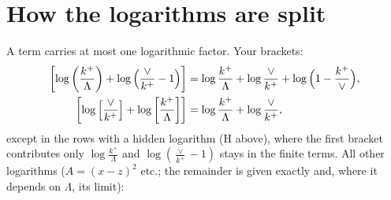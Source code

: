 \documentclass[10pt]{article}
\numberwithin{equation}{section}
\begin{document}
\section{How the logarithms are split}\label{sec:logs}
A term carries at most one logarithmic factor. Your brackets:
\begin{align}
\left[\log{\left(\frac{k^{+}}{\Lambda}\right)}+\log{\left(\frac{\vee}{k^{+}}-1\right)}\right]&=\log\frac{k^+}{\Lambda}+\log\frac{\vee}{k^+}+\log\Big(1-\frac{k^+}{\vee}\Big),\notag\\
\left[\log{\left[\frac{\vee}{k^{+}}\right]}+\log{\left[\frac{k^{+}}{\Lambda}\right]}\right]&=\log\frac{k^+}{\Lambda}+\log\frac{\vee}{k^+},\notag
\end{align}
except in the rows with a hidden logarithm (H above), where the first bracket contributes only $\log\frac{k^+}{\Lambda}$ and $\log(\frac{\vee}{k^+}-1)$ stays in the finite terms. All other logarithms ($A=(x-z)^2$ etc.; the remainder is given exactly and, where it depends on $\Lambda$, its limit):
\end{document}
